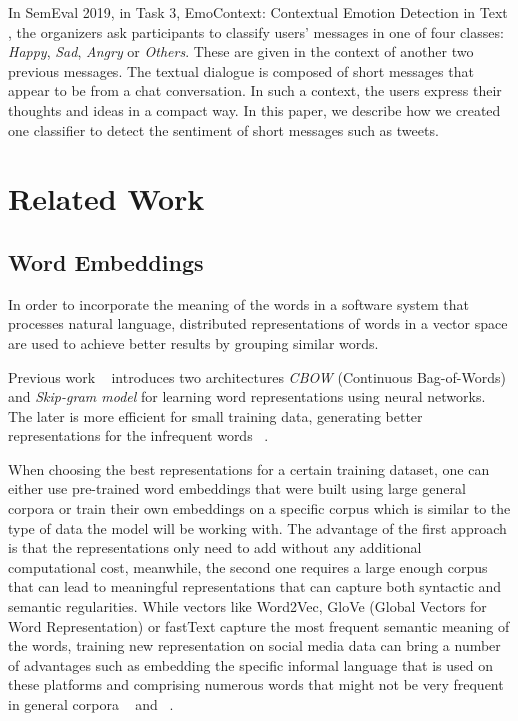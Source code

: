 \documentclass[11pt,a4paper]{article}
\begin{document}
In SemEval 2019, in Task 3, EmoContext: Contextual Emotion Detection in Text \cite{SemEval2019Task3}, the organizers ask participants to classify users’ messages in one of four classes: {\textit{Happy}}, {\textit{Sad}}, {\textit{Angry}} or {\textit{Others}}. These are given in the context of another two previous messages. The textual dialogue is composed of short messages that appear to be from a chat conversation. In such a context, the users express their thoughts and ideas in a compact way. In this paper, we describe how we created one classifier to detect the sentiment of short messages such as tweets. 
\section{Related Work}

\subsection{Word Embeddings}
In order to incorporate the meaning of the words in a software system that processes natural language, distributed representations of words in a vector space are used to achieve better results by grouping similar words. 

Previous work ~\cite{mikolov:13} introduces two architectures {\textit{CBOW}} (Continuous Bag-of-Words) and {\textit{Skip-gram model}} for learning word representations using neural networks. The later is more efficient for small training data, generating better representations for the infrequent words ~\cite{study:17}.

When choosing the best representations for a certain training dataset, one can either use pre-trained word embeddings that were built using large general corpora or train their own embeddings on a specific corpus which is similar to the type of data the model will be working with. The advantage of the first approach is that the representations only need to add without any additional computational cost, meanwhile, the second one requires a large enough corpus that can lead to meaningful representations that can capture both syntactic and semantic regularities. While vectors like Word2Vec, GloVe (Global Vectors for Word Representation) or fastText capture the most frequent semantic meaning of the words, training new representation on social media data can bring a number of advantages such as embedding the specific informal language that is used on these platforms and comprising numerous words that might not be very frequent in general corpora ~\cite{Rotari2017} and ~\cite{Flescan2017}.
\end{document}
